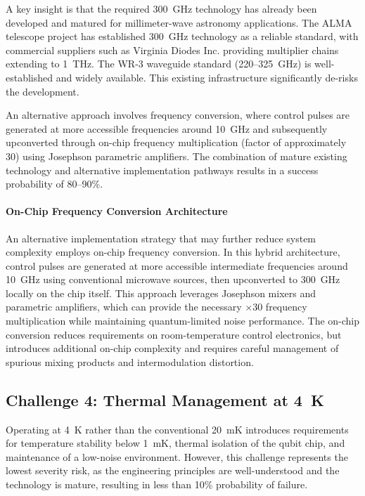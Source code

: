 A key insight is that the required 300~GHz technology has already been developed and matured for millimeter-wave astronomy applications. The ALMA telescope project has established 300~GHz technology as a reliable standard, with commercial suppliers such as Virginia Diodes Inc. providing multiplier chains extending to 1~THz. The WR-3 waveguide standard (220--325~GHz) is well-established and widely available. This existing infrastructure significantly de-risks the development.

An alternative approach involves frequency conversion, where control pulses are generated at more accessible frequencies around 10~GHz and subsequently upconverted through on-chip frequency multiplication (factor of approximately 30) using Josephson parametric amplifiers. The combination of mature existing technology and alternative implementation pathways results in a success probability of 80--90\%.

\paragraph{On-Chip Frequency Conversion Architecture}

An alternative implementation strategy that may further reduce system complexity employs on-chip frequency conversion. In this hybrid architecture, control pulses are generated at more accessible intermediate frequencies around 10~GHz using conventional microwave sources, then upconverted to 300~GHz locally on the chip itself. This approach leverages Josephson mixers and parametric amplifiers, which can provide the necessary $\times 30$ frequency multiplication while maintaining quantum-limited noise performance. The on-chip conversion reduces requirements on room-temperature control electronics, but introduces additional on-chip complexity and requires careful management of spurious mixing products and intermodulation distortion.

\subsection{Challenge 4: Thermal Management at 4~K}

Operating at 4~K rather than the conventional 20~mK introduces requirements for temperature stability below 1~mK, thermal isolation of the qubit chip, and maintenance of a low-noise environment. However, this challenge represents the lowest severity risk, as the engineering principles are well-understood and the technology is mature, resulting in less than 10\% probability of failure.

